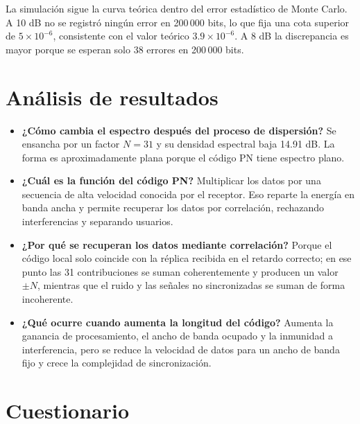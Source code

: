 \documentclass[11pt,a4paper]{article}
\begin{document}
La simulación sigue la curva teórica dentro del error estadístico de Monte Carlo. A
10 dB no se registró ningún error en 200\,000 bits, lo que fija una cota superior de
$5\times10^{-6}$, consistente con el valor teórico $3.9\times10^{-6}$. A 8 dB la
discrepancia es mayor porque se esperan solo 38 errores en 200\,000 bits.

\section{Análisis de resultados}

\begin{itemize}
  \item \textbf{¿Cómo cambia el espectro después del proceso de dispersión?} Se ensancha
        por un factor $N=31$ y su densidad espectral baja 14.91 dB. La forma es
        aproximadamente plana porque el código PN tiene espectro plano.
  \item \textbf{¿Cuál es la función del código PN?} Multiplicar los datos por una secuencia
        de alta velocidad conocida por el receptor. Eso reparte la energía en banda ancha
        y permite recuperar los datos por correlación, rechazando interferencias y
        separando usuarios.
  \item \textbf{¿Por qué se recuperan los datos mediante correlación?} Porque el código
        local solo coincide con la réplica recibida en el retardo correcto; en ese punto
        las 31 contribuciones se suman coherentemente y producen un valor $\pm N$, mientras
        que el ruido y las señales no sincronizadas se suman de forma incoherente.
  \item \textbf{¿Qué ocurre cuando aumenta la longitud del código?} Aumenta la ganancia de
        procesamiento, el ancho de banda ocupado y la inmunidad a interferencia, pero se
        reduce la velocidad de datos para un ancho de banda fijo y crece la complejidad de
        sincronización.
\end{itemize}

\section{Cuestionario}
\end{document}
